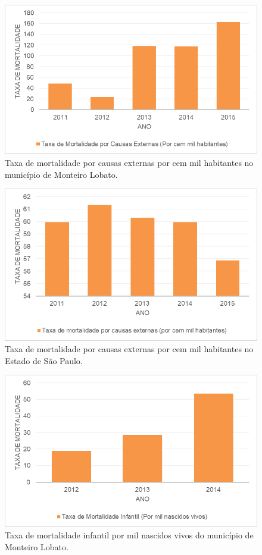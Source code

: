  \begin{figure}[h!]
	\centering
	\includegraphics[width=0.75\linewidth]{produtos/proddois/image041}
	\caption{Taxa de mortalidade por causas externas por cem mil habitantes no município de Monteiro Lobato.}
	\label{fig:image041}
\end{figure}

 \begin{figure}[h!]
	\centering
	\includegraphics[width=0.75\linewidth]{produtos/proddois/image042}
	\caption{Taxa de mortalidade por causas externas por cem mil habitantes no Estado de São Paulo.}
	\label{fig:image042}
\end{figure}
 \newpage
  \begin{figure}[h!]
 	\centering
 	\includegraphics[width=0.75\linewidth]{produtos/proddois/image043}
 	\caption{Taxa de mortalidade infantil por mil nascidos vivos do município de Monteiro Lobato.}
 	\label{fig:image043}
 \end{figure}

